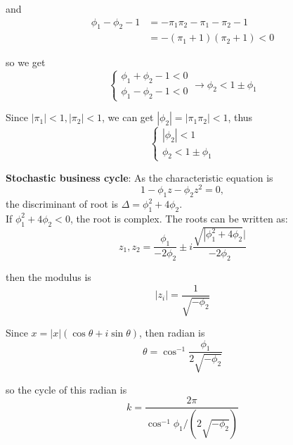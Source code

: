 \documentclass{article}
\begin{document}
\noindent and
\begin{equation*}
\begin{array}{cl}{\phi_1 - \phi_2 - 1} & = {- \pi_1\pi_2 - \pi_1 - \pi_2 - 1}\\
& = {- (\pi_1 + 1)(\pi_2 + 1)} < 0
\end{array}
\end{equation*}

\noindent so we get
\begin{equation*}
\left\{\begin{array}{lr}{\phi_1 + \phi_2 - 1 < 0}\\ {\phi_1 - \phi_2 - 1 < 0}
\end{array}\right. \longrightarrow \phi_2 < 1 \pm \phi_1
\end{equation*}

\noindent Since $|\pi_1| < 1, |\pi_2| < 1$, we can get $|\phi_2| = |\pi_1\pi_2| < 1$, thus
\begin{equation*}
\left\{\begin{array}{cc}{|\phi_2| < 1}\\
{\phi_2 < 1 \pm \phi_1}	
\end{array}\right.
\end{equation*}

\noindent \textbf{Stochastic business cycle}: As the characteristic equation is
\begin{equation*}\label{key}
1-\phi_1 z - \phi_2 z^2 = 0,
\end{equation*}
the discriminant of root is $\Delta = \phi_1^2 + 4\phi_2$.\\

\noindent If $\phi_{1}^{2}+4 \phi_{2}<0$, the root is complex. The roots can be written as:
\begin{equation*}
z_{1}, z_{2}=\frac{\phi_{1}}{-2 \phi_{2}} \pm i \frac{\sqrt{\left|\phi_{1}^{2}+4 \phi_{2}\right.} |}{-2 \phi_{2}}
\end{equation*}

\noindent then the modulus is
\begin{equation*}
\left|z_{i}\right|=\frac{1}{\sqrt{-\phi_{2}}}
\end{equation*}

\noindent Since $x = |x| (\cos \theta + i \sin \theta)$, then radian is
\begin{equation*}
\theta=\cos ^{-1} \frac{\phi_{1}}{2 \sqrt{-\phi_{2}}}
\end{equation*}

\noindent so the cycle of this radian is
\begin{equation*}
k = \frac{2\pi}{\cos ^{-1} \phi_{1} / (2 \sqrt{-\phi_{2}})}
\end{equation*}
\end{document}
